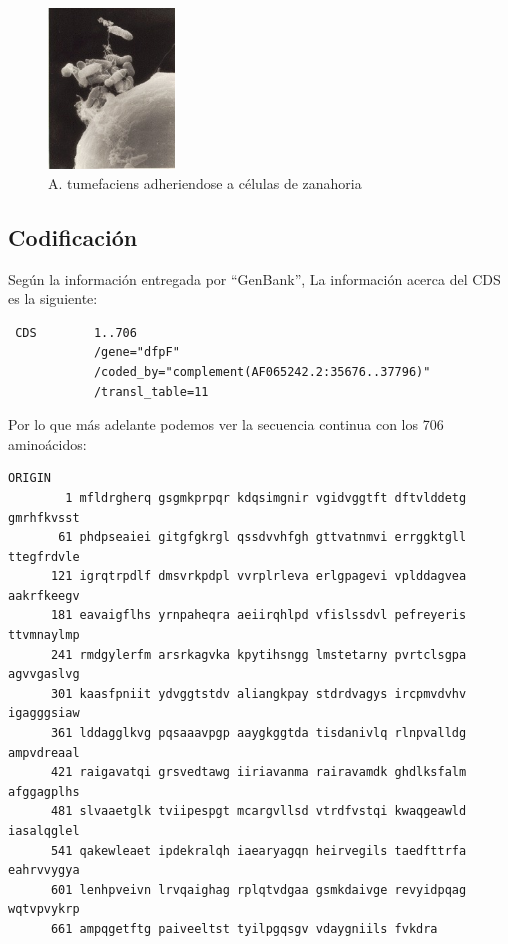 \begin{itemize}
		\begin{figure}[!h]
			\begin{center}
				\includegraphics[width=0.3\textwidth]{img/bacteria2}
			\end{center}
			\caption{A. tumefaciens adheriendose a células de zanahoria}
			\label{fig:2}
		\end{figure}
		
\end{itemize}

\subsection{Codificación}

Según la información entregada por ``GenBank'',
La información acerca del CDS es la siguiente:
\begin{verbatim}
 CDS        1..706
            /gene="dfpF"
            /coded_by="complement(AF065242.2:35676..37796)"
            /transl_table=11
\end{verbatim}

Por lo que más adelante podemos ver la secuencia continua con los 706 aminoácidos:

\begin{verbatim}
ORIGIN      
        1 mfldrgherq gsgmkprpqr kdqsimgnir vgidvggtft dftvlddetg gmrhfkvsst
       61 phdpseaiei gitgfgkrgl qssdvvhfgh gttvatnmvi errggktgll ttegfrdvle
      121 igrqtrpdlf dmsvrkpdpl vvrplrleva erlgpagevi vplddagvea aakrfkeegv
      181 eavaigflhs yrnpaheqra aeiirqhlpd vfislssdvl pefreyeris ttvmnaylmp
      241 rmdgylerfm arsrkagvka kpytihsngg lmstetarny pvrtclsgpa agvvgaslvg
      301 kaasfpniit ydvggtstdv aliangkpay stdrdvagys ircpmvdvhv igagggsiaw
      361 lddagglkvg pqsaaavpgp aaygkggtda tisdanivlq rlnpvalldg ampvdreaal
      421 raigavatqi grsvedtawg iiriavanma rairavamdk ghdlksfalm afggagplhs
      481 slvaaetglk tviipespgt mcargvllsd vtrdfvstqi kwaqgeawld iasalqglel
      541 qakewleaet ipdekralqh iaearyagqn heirvegils taedfttrfa eahrvvygya
      601 lenhpveivn lrvqaighag rplqtvdgaa gsmkdaivge revyidpqag wqtvpvykrp
      661 ampqgetftg paiveeltst tyilpgqsgv vdaygniils fvkdra
\end{verbatim}

